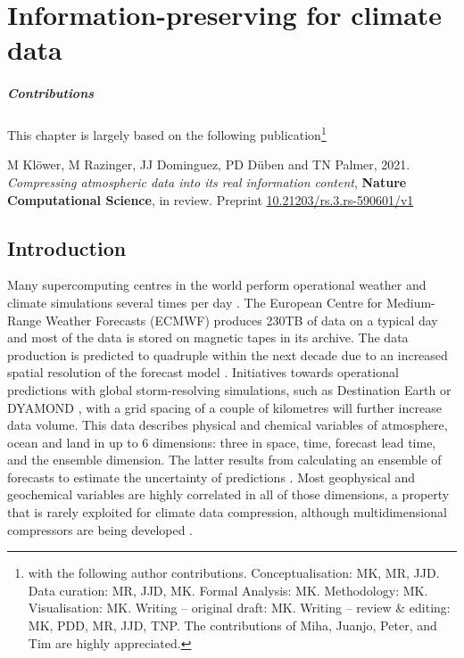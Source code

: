 \chapter{Information-preserving  for climate data}
\label{chap:compression}

\small \paragraph{Contributions} This chapter is largely based on the following publication\footnote{with the following author contributions.
Conceptualisation: MK, MR, JJD. Data curation: MR, JJD, MK. Formal Analysis: MK. Methodology: MK. Visualisation: MK. Writing –
original draft: MK. Writing – review \& editing: MK, PDD, MR, JJD, TNP. The contributions of Miha, Juanjo, Peter, and Tim are highly
appreciated.}

\vspace{\baselineskip}
\indent M Klöwer, M Razinger, JJ Dominguez, PD Düben and TN Palmer, 2021. \emph{Compressing atmospheric data into its real
information content}, \textbf{Nature Computational Science}, in review. Preprint \href{https://doi.org/10.21203/rs.3.rs-590601/v1}{10.21203/rs.3.rs-590601/v1}
\vspace{\baselineskip}
\normalsize

\section{Introduction}
\label{sec:compression_introduction}

Many supercomputing centres in the world perform operational weather and climate simulations several times per day \citep{Bauer2015}.
The European Centre for Medium-Range Weather Forecasts (ECMWF) produces 230TB of data on a typical day and
most of the data is stored on magnetic tapes in its archive. The data production is predicted to quadruple within the
next decade due to an increased spatial resolution of the forecast model \citep{Bauer2020,Voosen2020,Schar2020}.
Initiatives towards operational predictions with global storm-resolving simulations, such as Destination Earth
\citep{Bauer2021,Bauer2021a} or DYAMOND \citep{Stevens2019}, with a grid spacing of a couple of
kilometres will further increase data volume. This data describes physical and chemical variables of atmosphere, ocean
and land in up to 6 dimensions: three in space, time, forecast lead time, and the ensemble dimension. The latter results
from calculating an ensemble of forecasts to estimate the uncertainty of predictions \citep{Molteni1996,Palmer2019}.
Most geophysical and geochemical variables are highly correlated in all of those dimensions, a property that is rarely
exploited for climate data compression, although multidimensional compressors are being developed
\citep{Ballester-Ripoll2020,Lindstrom2014,vonLarcher2019,Zhao2020,Di2016}.

